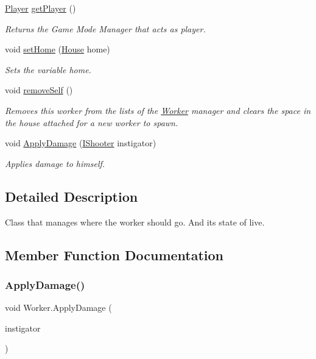 \begin{DoxyCompactItemize}
\mbox{\hyperlink{class_player}{Player}} \mbox{\hyperlink{class_worker_a5e30c24482b9784f59623e8443e46827}{get\+Player}} ()
\begin{DoxyCompactList}\small\item\em Returns the Game Mode Manager that acts as player. \end{DoxyCompactList}\item 
void \mbox{\hyperlink{class_worker_a13feed5a2e9d542b506ac1d1454d2ebf}{set\+Home}} (\mbox{\hyperlink{class_house}{House}} home)
\begin{DoxyCompactList}\small\item\em Sets the variable home. \end{DoxyCompactList}\item 
void \mbox{\hyperlink{class_worker_a7a73629546f14e99a70363e5f7049092}{remove\+Self}} ()
\begin{DoxyCompactList}\small\item\em Removes this worker from the lists of the \mbox{\hyperlink{class_worker}{Worker}} manager and clears the space in the house attached for a new worker to spawn. \end{DoxyCompactList}\item 
void \mbox{\hyperlink{class_worker_a4ff9d9772297f4d306e8203bcf1f8fa6}{Apply\+Damage}} (\mbox{\hyperlink{interface_i_shooter}{I\+Shooter}} instigator)
\begin{DoxyCompactList}\small\item\em Applies damage to himself. \end{DoxyCompactList}\end{DoxyCompactItemize}


\subsection{Detailed Description}
Class that manages where the worker should go. And its state of live. 



\subsection{Member Function Documentation}
\mbox{\label{class_worker_a4ff9d9772297f4d306e8203bcf1f8fa6}} 
\subsubsection{\texorpdfstring{Apply\+Damage()}{ApplyDamage()}}
{\footnotesize\ttfamily void Worker.\+Apply\+Damage (\begin{DoxyParamCaption}\item[{\mbox{\hyperlink{interface_i_shooter}{I\+Shooter}}}]{instigator }\end{DoxyParamCaption})}



